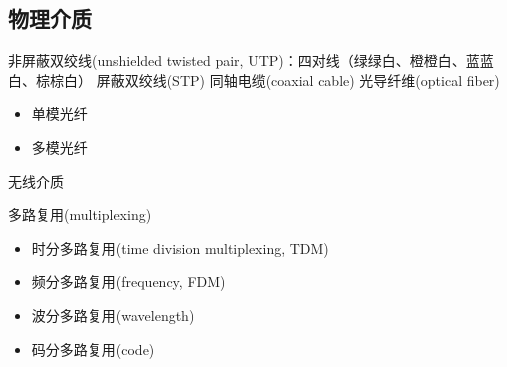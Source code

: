 \subsection{物理介质}
非屏蔽双绞线(unshielded twisted pair, UTP)：四对线（绿绿白、橙橙白、蓝蓝白、棕棕白）
屏蔽双绞线(STP)
同轴电缆(coaxial cable)
光导纤维(optical fiber)
\begin{itemize}
	\item 单模光纤
	\item 多模光纤
\end{itemize}

无线介质

多路复用(multiplexing)
\begin{itemize}
	\item 时分多路复用(time division multiplexing, TDM)
	\item 频分多路复用(frequency, FDM)
	\item 波分多路复用(wavelength)
	\item 码分多路复用(code)
\end{itemize}
